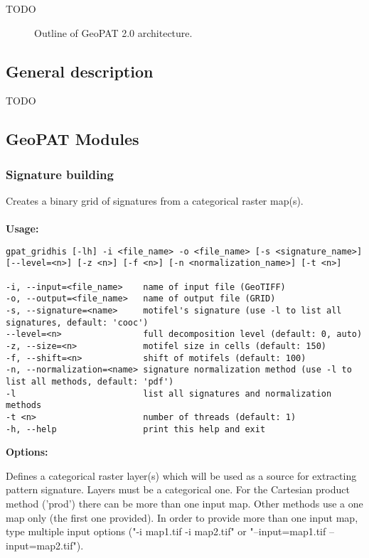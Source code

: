 TODO
\begin{figure}[H]
	\caption{Outline of GeoPAT 2.0 architecture.}
	\label{FIG:GPAT} 
\end{figure}

\subsection{General description}
TODO

\subsection{GeoPAT Modules}

\subsubsection{Signature building}

Creates a binary grid of signatures from a categorical raster map(s).
\\\\
{\bf Usage:}

\begin{minipage}{\linewidth}
\begin{lstlisting}
gpat_gridhis [-lh] -i <file_name> -o <file_name> [-s <signature_name>] [--level=<n>] [-z <n>] [-f <n>] [-n <normalization_name>] [-t <n>]

-i, --input=<file_name>    name of input file (GeoTIFF)
-o, --output=<file_name>   name of output file (GRID)
-s, --signature=<name>     motifel's signature (use -l to list all signatures, default: 'cooc')
--level=<n>                full decomposition level (default: 0, auto)
-z, --size=<n>             motifel size in cells (default: 150)
-f, --shift=<n>            shift of motifels (default: 100)
-n, --normalization=<name> signature normalization method (use -l to list all methods, default: 'pdf')
-l                         list all signatures and normalization methods
-t <n>                     number of threads (default: 1)
-h, --help                 print this help and exit
\end{lstlisting}
\end{minipage}

{\bf Options:}


Defines a categorical raster layer(s) which will be used as a source for extracting pattern signature.
Layers must be a categorical one. For the Cartesian product method ('prod') there can be more than one input map.
Other methods use a one map only (the first one provided). 
In order to provide more than one input map, type multiple input options ("-i map1.tif -i map2.tif" or "--input=map1.tif --input=map2.tif").

